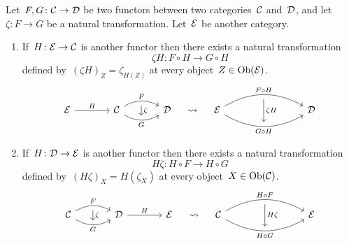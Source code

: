 \begin{lemma*}
  Let~$F, G \colon \mathcal{C} \to \mathcal{D}$ be two functors between two categories~$\mathcal{C}$ and~$\mathcal{D}$, and let~$\zeta \colon F \to G$ be a natural transformation.
  Let~$\mathcal{E}$ be another category.
  \begin{enumerate}
    \item
      If~$H \colon \mathcal{E} \to \mathcal{C}$ is another functor then there exists a natural transformation
      \[
                \zeta H
        \colon  F \circ H
        \to     G \circ H
      \]
      defined by~$(\zeta H)_Z = \zeta_{H(Z)}$ at every object~$Z \in \operatorname{Ob}(\mathcal{E})$.
      \[
        \begin{tikzcd}[column sep = large]
            \Ecat
            \arrow{r}[above]{H}
          & \Ccat
            \arrow[bend left]{r}[above]{F}[below,name=U]{}
            \arrow[bend right]{r}[below]{G}[above,name=D]{}
            \arrow[from=U, to=D, right, "\zeta"]
          & \Dcat
        \end{tikzcd}
        \quad\leadsto\quad
        \begin{tikzcd}[column sep = large]
            \Ecat
            \arrow[bend left]{rr}[above]{F \circ H}[below,name=U]{}
            \arrow[bend right]{rr}[below]{G \circ H}[above,name=D]{}
            \arrow[from=U, to=D, right, "\zeta H"]
          & {}
          & \Dcat
        \end{tikzcd}
      \]
    \item
      If~$H \colon \mathcal{D} \to \mathcal{E}$ is another functor then there exists a natural transformation
      \[
                H \zeta
        \colon  H \circ F
        \to     H \circ G
      \]
      defined by~$(H \zeta)_X = H(\zeta_X)$ at every object~$X \in \operatorname{Ob}(\mathcal{C})$.
      \[
        \begin{tikzcd}[column sep = large]
            \Ccat
            \arrow[bend left]{r}[above]{F}[below,name=U]{}
            \arrow[bend right]{r}[below]{G}[above,name=D]{}
            \arrow[from=U, to=D, right, "\zeta"]
          & \Dcat
            \arrow{r}[above]{H}
          & \Ecat
        \end{tikzcd}
        \quad\leadsto\quad
        \begin{tikzcd}[column sep = large]
            \Ccat
            \arrow[bend left]{rr}[above]{H \circ F}[below,name=U]{}
            \arrow[bend right]{rr}[below]{H \circ G}[above,name=D]{}
            \arrow[from=U, to=D, right, "H \zeta"]
          & {}
          & \Ecat
        \end{tikzcd}
      \]
  \end{enumerate}
\end{lemma*}



